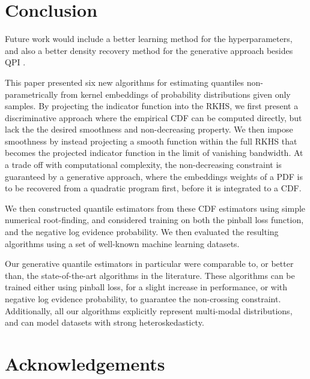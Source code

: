 \documentclass[twoside]{article} \usepackage{aistats2017}
\theoremstyle{definition}
\newcommand{\warn}[1]{{\color{red} #1}}
\newcommand{\qpi}{QPI }
\begin{document}
\section{Conclusion}
\label{sec:conclusion}

	\warn{Future work would include a better learning method for the hyperparameters, and also a better density recovery method for the generative approach besides \qpi.}
	
	This paper presented six new algorithms for estimating quantiles non-parametrically from kernel embeddings of probability distributions given only samples. By projecting the indicator function into the RKHS, we first present a discriminative approach where the empirical CDF can be computed directly, but lack the the desired smoothness and non-decreasing property. We then impose smoothness by instead projecting a smooth function within the full RKHS that becomes the projected indicator function in the limit of vanishing bandwidth. At a trade off with computational complexity, the non-decreasing constraint is guaranteed by a generative approach, where the embeddings weights of a PDF is to be recovered from a quadratic program first, before it is integrated to a CDF.
	
	We then constructed quantile estimators from these CDF estimators using simple numerical root-finding, and considered training on both the pinball loss function, and the negative log evidence probability. We then evaluated the resulting algorithms using a set of well-known machine learning datasets.
	
	Our generative quantile estimators in particular were comparable to, or better than, the state-of-the-art algorithms in the literature. These algorithms can be trained either using pinball loss, for a slight increase in performance, or with negative log evidence probability, to guarantee the non-crossing constraint. Additionally, all our algorithms explicitly represent multi-modal distributions, and can model datasets with strong heteroskedasticty.

\section*{Acknowledgements}



\end{document}
